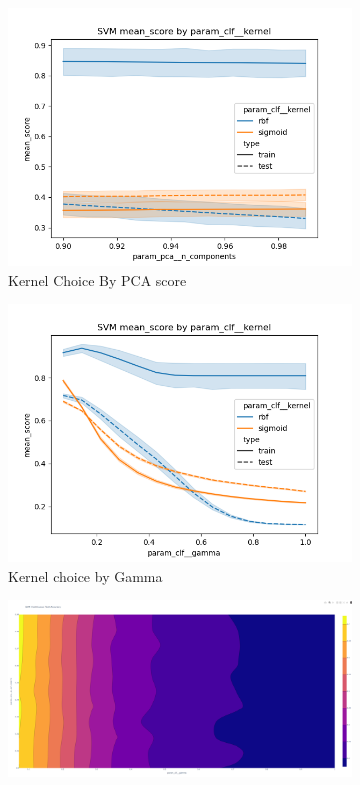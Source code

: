 \documentclass[12pt]{article}
\begin{document}
\begin{figure}
    \begin{subfigure}{.5\textwidth}
        \includegraphics[width=.95\textwidth]{../../results_Experiment2/svm/param_clf__kernel_mean_score_param_pca__n_components.png}
        \caption{Kernel Choice By PCA score}
        \end{subfigure}%
      \begin{subfigure}{.5\textwidth}
        \includegraphics[width=.95\textwidth]{../../results_Experiment2/svm/param_clf__kernel_mean_score_param_clf__gamma.png}
        \caption{Kernel choice by Gamma}
      \end{subfigure}
    \begin{subfigure}{.95\textwidth}
        \includegraphics[width=.95\textwidth]{../../results_Experiment2/svm/Contour.PNG}

\end{subfigure}
\end{figure}
\end{document}
